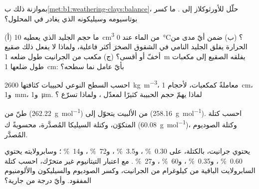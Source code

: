 \begin{exercise}[$\star$]\label{exo:b1:weathering-clays:3}
بموازنة ذلك ب\cref{met:b1:weathering-clays:balance}، حلّل  للأورثوكلاز  إلى . ما كسر بوتاسيومه وسيليكونه الذي يغادر في المحلول؟
\end{exercise}

\begin{exercise}[$\star$]\label{exo:b1:weathering-clays:4}
(أ) ما حجم الجليد الذي يعطيه \qty{10}{cm^3} من الماء عند \qty{0}{\celsius}؟ (ب) ضمن أيّ مدى من الحرارة يفلق الجليد النامي في الشقوق الصخرَ أكثر فاعلية، ولماذا لا يفعل ذلك صقيع أخفّ أو أقسى؟ (ج) مكعب من الجرانيت طول ضلعه \qty{1}{m} يفلقه الصقيع إلى مكعبات طول ضلعها \qty{1}{cm}: بأيّ عامل نما سطحه؟
\end{exercise}

\begin{exercise}[$\star\star$]\label{exo:b1:weathering-clays:5}
احسب السطح النوعي لحبيبات  كثافتها \qty{2600}{kg.m^{-3}}، معاملةً كمكعبات، لأحجام \qty{1}{cm}، و\qty{1}{mm}، و\qty{1}{\micro m}. لماذا يهمّ حجم الحبيبة كثيرًا لمعدّل ، ولماذا تسرّع  ؟
\end{exercise}

\begin{exercise}[$\star\star$]\label{exo:b1:weathering-clays:6}
طنّ من  (\qty{262.22}{g.mol^{-1}}) من الألبيت يتحوّل إلى  (\qty{258.16}{g.mol^{-1}}). احسب كتلة  المتكوّن، وكتلة السيليكا المُصدَّرة، محسوبةً ك (\qty{60.08}{g.mol^{-1}})، وكتلة الصوديوم المُصدَّر.
\end{exercise}

\begin{exercise}[$\star\star$]\label{exo:b1:weathering-clays:7}
يحتوي جرانيت، بالكتلة، على \qty{0.30}{\percent} ، و\qty{3.5}{\percent} ، و\qty{72}{\percent} ، و\qty{14}{\percent} ؛ وسابرولايته يحتوي \qty{0.60}{\percent} ، و\qty{0.35}{\percent} ، و\qty{60}{\percent} ، و\qty{27}{\percent} . مع اعتبار التيتانيوم غير متحرّك، احسب كتلة السابرولايت الباقية من كيلوغرام من الجرانيت، وكسر الصوديوم والسيليكون والألومنيوم المفقود. وأيّ درجة من  جارية؟
\end{exercise}

